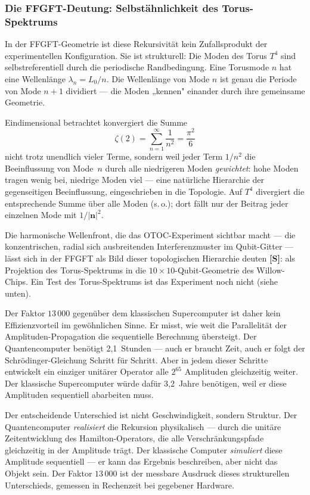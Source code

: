 \subsubsection*{Die FFGFT-Deutung: Selbstähnlichkeit des Torus-Spektrums}

In der FFGFT-Geometrie ist diese Rekursivität kein Zufallsprodukt der
experimentellen Konfiguration. Sie ist strukturell: Die Moden des Torus
$T^4$ sind selbstreferentiell durch die periodische Randbedingung.
Eine Torusmode $n$ hat eine Wellenlänge $\lambda_n = L_0/n$. Die Wellenlänge
von Mode $n$ ist genau die Periode von Mode $n+1$ dividiert — die Moden
„kennen" einander durch ihre gemeinsame Geometrie.

Eindimensional betrachtet konvergiert die Summe
\begin{equation}
    \zeta(2) = \sum_{n=1}^{\infty} \frac{1}{n^2} = \frac{\pi^2}{6}
\end{equation}
nicht trotz unendlich vieler Terme, sondern weil jeder
Term $1/n^2$ die Beeinflussung von Mode~$n$ durch alle niedrigeren Moden
\emph{gewichtet}: hohe Moden tragen wenig bei, niedrige Moden viel —
eine natürliche Hierarchie der gegenseitigen Beeinflussung, eingeschrieben
in die Topologie. Auf $T^4$ divergiert die entsprechende Summe über alle Moden
(s.\,o.); dort fällt nur der Beitrag jeder einzelnen Mode mit $1/|\mathbf{n}|^2$.

Die harmonische Wellenfront, die das OTOC-Experiment sichtbar macht — die
konzentrischen, radial sich ausbreitenden Interferenzmuster im Qubit-Gitter
— lässt sich in der FFGFT als Bild dieser topologischen Hierarchie deuten \textbf{[S]}:
als Projektion des Torus-Spektrums in die $10 \times 10$-Qubit-Geometrie
des Willow-Chips. Ein Test des Torus-Spektrums ist das Experiment noch nicht
(siehe unten).

Der Faktor $13\,000$ gegenüber dem klassischen Supercomputer ist daher kein
Effizienzvorteil im gewöhnlichen Sinne. Er misst, wie weit die Parallelität
der Amplituden-Propagation die sequentielle Berechnung übersteigt. Der
Quantencomputer benötigt 2,1~Stunden — auch er braucht Zeit, auch er folgt
der Schrödinger-Gleichung Schritt für Schritt. Aber in jedem dieser Schritte
entwickelt ein einziger unitärer Operator alle $2^{65}$ Amplituden gleichzeitig
weiter. Der klassische Supercomputer würde dafür 3,2~Jahre benötigen, weil er
diese Amplituden sequentiell abarbeiten muss.

\begin{foundation}
Der entscheidende Unterschied ist nicht Geschwindigkeit, sondern Struktur.
Der Quantencomputer \emph{realisiert} die Rekursion physikalisch — durch die
unitäre Zeitentwicklung des Hamilton-Operators, die alle Verschränkungspfade
gleichzeitig in der Amplitude trägt.
Der klassische Computer \emph{simuliert} diese Amplitude sequentiell —
er kann das Ergebnis beschreiben, aber nicht das Objekt sein.
Der Faktor $13\,000$ ist der messbare Ausdruck dieses strukturellen Unterschieds,
gemessen in Rechenzeit bei gegebener Hardware.
\end{foundation}


